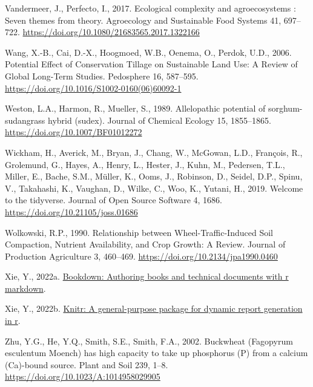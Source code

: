 \documentclass[
  12pt,
]{article}
\newlength{\cslhangindent}
\newlength{\cslentryspacingunit} %
\newenvironment{CSLReferences}[2] %
 {%
  \setlength{\parindent}{0pt}
  \ifodd #1
  \let\oldpar\par
  \def\par{\hangindent=\cslhangindent\oldpar}
  \fi
  \setlength{\parskip}{#2\cslentryspacingunit}
 }%
 {}
\begin{document}
\begin{CSLReferences}{1}{0}
\leavevmode{}%
Vandermeer, J., Perfecto, I., 2017. Ecological complexity and agroecosystems : Seven themes from theory. Agroecology and Sustainable Food Systems 41, 697--722. \url{https://doi.org/10.1080/21683565.2017.1322166}

\leavevmode{}%
Wang, X.-B., Cai, D.-X., Hoogmoed, W.B., Oenema, O., Perdok, U.D., 2006. Potential {Effect} of {Conservation Tillage} on {Sustainable Land Use}: {A Review} of {Global Long-Term Studies}. Pedosphere 16, 587--595. \url{https://doi.org/10.1016/S1002-0160(06)60092-1}

\leavevmode{}%
Weston, L.A., Harmon, R., Mueller, S., 1989. Allelopathic potential of sorghum-sudangrass hybrid (sudex). Journal of Chemical Ecology 15, 1855--1865. \url{https://doi.org/10.1007/BF01012272}

\leavevmode{}%
Wickham, H., Averick, M., Bryan, J., Chang, W., McGowan, L.D., François, R., Grolemund, G., Hayes, A., Henry, L., Hester, J., Kuhn, M., Pedersen, T.L., Miller, E., Bache, S.M., Müller, K., Ooms, J., Robinson, D., Seidel, D.P., Spinu, V., Takahashi, K., Vaughan, D., Wilke, C., Woo, K., Yutani, H., 2019. Welcome to the {tidyverse}. Journal of Open Source Software 4, 1686. \url{https://doi.org/10.21105/joss.01686}

\leavevmode{}%
Wolkowski, R.P., 1990. Relationship between {Wheel-Traffic-Induced Soil Compaction}, {Nutrient Availability}, and {Crop Growth}: {A Review}. Journal of Production Agriculture 3, 460--469. \url{https://doi.org/10.2134/jpa1990.0460}

\leavevmode{}%
Xie, Y., 2022a. \href{https://github.com/rstudio/bookdown}{Bookdown: Authoring books and technical documents with r markdown}.

\leavevmode{}%
Xie, Y., 2022b. \href{https://yihui.org/knitr/}{Knitr: A general-purpose package for dynamic report generation in r}.

\leavevmode{}%
Zhu, Y.G., He, Y.Q., Smith, S.E., Smith, F.A., 2002. Buckwheat ({Fagopyrum} esculentum {Moench}) has high capacity to take up phosphorus ({P}) from a calcium ({Ca})-bound source. Plant and Soil 239, 1--8. \url{https://doi.org/10.1023/A:1014958029905}

\end{CSLReferences}
\end{document}

